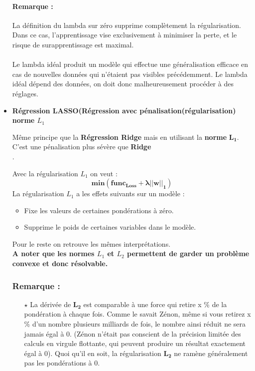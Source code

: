 \documentclass[french]{article}
\begin{document}
\begin{itemize}[label=\textbullet, font=\LARGE \color{red}]
\paragraph{Remarque : } 
La définition du lambda sur zéro supprime complètement la régularisation. Dans ce cas, l'apprentissage vise exclusivement à minimiser la perte, et le risque de surapprentissage est maximal.\\\\

Le lambda idéal produit un modèle qui effectue une généralisation efficace en cas de nouvelles données qui n'étaient pas visibles précédemment. Le lambda idéal dépend des données, on doit donc malheureusement procéder à des réglages.


\item \textbf{Régression LASSO(Régression avec pénalisation(régularisation) norme $L_{1}$}

Même principe que la \textbf{Régression Ridge} mais en utilisant la \textbf{norme} $\bm{L_{1}}$. C'est une pénalisation plus sévère que \textbf{Ridge}\\.

Avec la régularisation $L_{1}$ on veut  : $$\bm{min(func_{Loss}+\lambda ||w||_{1})}$$
La régularisation $L_{1}$ a les effets suivants sur un modèle : 
\begin{itemize}[label=\textbullet]
\item Fixe les valeurs de certaines pondérations à zéro.
\item Supprime le poids de certaines variables dans le modèle.
\end{itemize}

Pour le reste on retrouve les mêmes interprétations.\\

\textbf{A noter que les normes $L_{1}$ et $L_{2}$ permettent de garder un problème convexe et donc résolvable.}\\

\subsubsection{Remarque : \\}

\begin{itemize}
	
	\item[$\star$] La dérivée de $\bm{L_{2}}$ est comparable à une force qui retire x \% de la pondération à chaque fois. Comme le savait Zénon, même si vous retirez x \% d'un nombre plusieurs milliards de fois, le nombre ainsi réduit ne sera jamais égal à 0. (Zénon n'était pas conscient de la précision limitée des calculs en virgule flottante, qui peuvent produire un résultat exactement égal à 0). Quoi qu'il en soit, la régularisation $\bm{L_{2}}$ ne ramène généralement pas les pondérations à 0.\\
	

\end{itemize}
\end{itemize}
\end{document}
